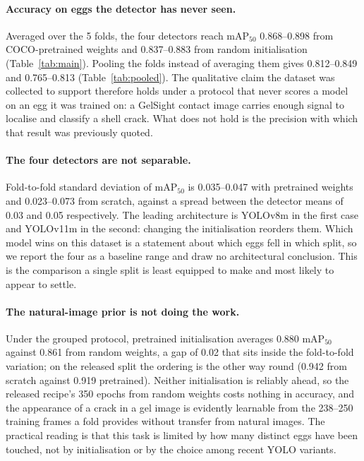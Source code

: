 \paragraph{Accuracy on eggs the detector has never seen.} Averaged over the 5 folds, the
four detectors reach mAP$_{50}$ 0.868--0.898 from COCO-pretrained weights and 0.837--0.883 from
random initialisation (Table~\ref{tab:main}). Pooling the folds instead of averaging them
gives 0.812--0.849 and 0.765--0.813 (Table~\ref{tab:pooled}). The qualitative claim the
dataset was collected to support therefore holds under a protocol that never scores a model
on an egg it was trained on: a GelSight contact image carries enough signal to localise and
classify a shell crack. What does not hold is the precision with which that result was
previously quoted.

\paragraph{The four detectors are not separable.} Fold-to-fold standard deviation of mAP$_{50}$
is 0.035--0.047 with pretrained weights and 0.023--0.073 from scratch, against a spread
between the detector means of 0.03 and 0.05 respectively. The leading architecture is
YOLOv8m in the first case and YOLOv11m in the second: changing the initialisation reorders
them. Which model wins on this dataset is a statement about which eggs fell in which split,
so we report the four as a baseline range and draw no architectural conclusion. This is the
comparison a single split is least equipped to make and most likely to appear to settle.

\paragraph{The natural-image prior is not doing the work.} Under the grouped protocol,
pretrained initialisation averages 0.880 mAP$_{50}$ against 0.861 from random weights, a gap of
0.02 that sits inside the fold-to-fold variation; on the released split the ordering is the
other way round (0.942 from scratch against 0.919 pretrained). Neither initialisation is
reliably ahead, so the released recipe's 350 epochs from random weights costs nothing in
accuracy, and the appearance of a crack in a gel image is evidently learnable from the
238--250 training frames a fold provides without transfer from natural images. The practical
reading is that this task is limited by how many distinct eggs have been touched, not by
initialisation or by the choice among recent YOLO variants.

